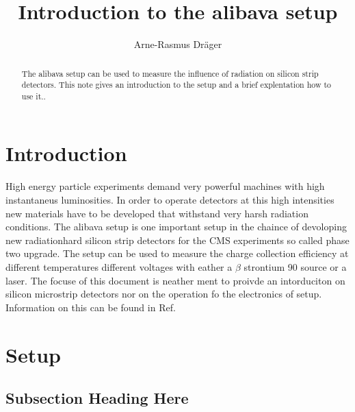 \documentclass{article}
\begin{document}
\title{Introduction to the alibava setup}
\author{Arne-Rasmus Dr\"ager}

\maketitle

\begin{abstract}
The alibava setup can be used to measure the influence of radiation on silicon strip detectors. This note gives an introduction to the setup and a brief explentation how to use it..
\end{abstract}



\section{Introduction}

High energy particle experiments demand very powerful machines with high instantaneus luminosities. In order to operate detectors at this high intensities new materials have to be developed that withstand very harsh radiation conditions. The alibava setup is one important setup in the chaince of devoloping new radiationhard silicon strip detectors for the CMS experiments so called phase two upgrade. The setup can be used to measure the charge collection efficiency at different temperatures different voltages with eather a $\beta$ strontium 90 source or a laser. The focuse of this document is neather ment to proivde an intorduciton on silicon microstrip detectors nor on the operation fo the electronics of setup. Information on this can be found in Ref. \cite{Silicon_Microstrip_dectectors_anna_peisert} 

\section{Setup}



\subsection{Subsection Heading Here}
\end{document}
